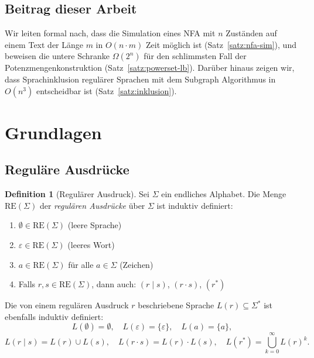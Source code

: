 ﻿\documentclass[a4paper,12pt]{article}
\theoremstyle{definition}
\newtheorem{definition}{Definition}
\begin{document}
\subsection{Beitrag dieser Arbeit}

Wir leiten formal nach, dass die Simulation eines NFA mit $n$ Zuständen auf
einem Text der Länge $m$ in $O(n \cdot m)$ Zeit möglich ist (Satz~\ref{satz:nfa-sim}),
und beweisen die untere Schranke $\Omega(2^n)$ für den schlimmsten Fall der
Potenzmengenkonstruktion (Satz~\ref{satz:powerset-lb}). Darüber hinaus zeigen
wir, dass Sprachinklusion regulärer Sprachen mit dem Subgraph Algorithmus in
$O(n^3)$ entscheidbar ist (Satz~\ref{satz:inklusion}).

\section{Grundlagen}

\subsection{Reguläre Ausdrücke}

\begin{definition}[Regulärer Ausdruck]
	Sei $\Sigma$ ein endliches Alphabet. Die Menge $\mathrm{RE}(\Sigma)$ der
	\emph{regulären Ausdrücke} über $\Sigma$ ist induktiv definiert:
	\begin{enumerate}
		\item $\emptyset \in \mathrm{RE}(\Sigma)$ (leere Sprache)
		\item $\varepsilon \in \mathrm{RE}(\Sigma)$ (leeres Wort)
		\item $a \in \mathrm{RE}(\Sigma)$ für alle $a \in \Sigma$ (Zeichen)
		\item Falls $r, s \in \mathrm{RE}(\Sigma)$, dann auch:
		      $(r \mid s)$, $(r \cdot s)$, $(r^*)$
	\end{enumerate}
\end{definition}

Die von einem regulären Ausdruck $r$ beschriebene Sprache $L(r) \subseteq \Sigma^*$
ist ebenfalls induktiv definiert:
\[
	L(\emptyset) = \emptyset,\quad
	L(\varepsilon) = \{\varepsilon\},\quad
	L(a) = \{a\},
\]
\[
	L(r \mid s) = L(r) \cup L(s),\quad
	L(r \cdot s) = L(r) \cdot L(s),\quad
	L(r^*) = \bigcup_{k=0}^{\infty} L(r)^k.
\]
\end{document}
